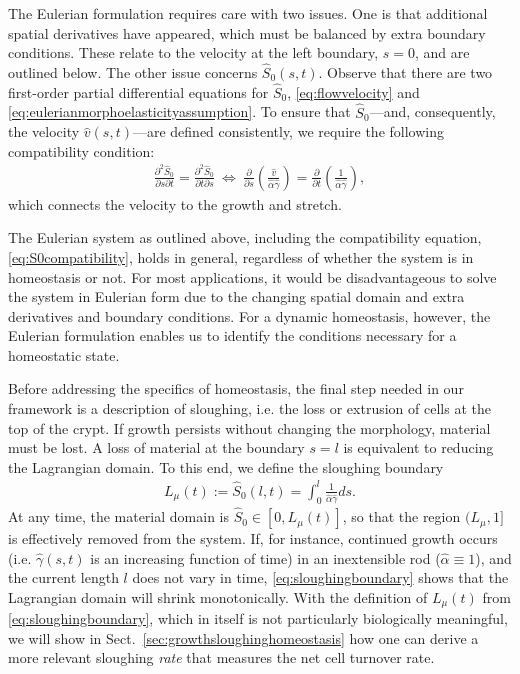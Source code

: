 The Eulerian formulation requires care with two issues. One is that additional spatial derivatives have appeared, which must be balanced by extra boundary conditions. These relate to the velocity at the left boundary, $s = 0$, and are outlined below. The other issue concerns $\hat{S}_0(s, t)$. Observe that there are two first-order partial differential equations for $\hat{S}_0$, \eqref{eq:flowvelocity} and \eqref{eq:eulerianmorphoelasticityassumption}. To ensure that $\hat{S}_0$---and, consequently, the velocity $\hat{v}(s, t)$---are defined consistently, we require the following compatibility condition:
\begin{align}
\frac{\partial^2\hat{S}_0}{\partial s\partial t} = \frac{\partial^2\hat{S}_0}{\partial t \partial s} \ \Longleftrightarrow\ \frac{\partial}{\partial s}\left(\frac{\hat{v}}{\hat{\alpha}\hat{\gamma}}\right) = \frac{\partial}{\partial t}\left(\frac{1}{\hat{\alpha}\hat{\gamma}}\right),\label{eq:S0compatibility}
\end{align}
which connects the velocity to the growth and stretch. 

The Eulerian system as outlined above, including the compatibility equation, \eqref{eq:S0compatibility}, holds in general, regardless of whether the system is in homeostasis or not. For most applications, it would be disadvantageous to solve the system in Eulerian form due to the changing spatial domain and extra derivatives and boundary conditions. For a dynamic homeostasis, however, the Eulerian formulation enables us to identify the conditions necessary for a homeostatic state. 

Before addressing the specifics of homeostasis, the final step needed in our framework is a description of sloughing, i.e. the loss or extrusion of cells at the top of the crypt. If growth persists without changing the morphology, material must be lost. A loss of material at the boundary $s=l$ is equivalent to reducing the Lagrangian domain. 
To this end, we define the sloughing boundary
\begin{align}
L_\mu(t) := \hat{S}_0(l, t) =  \int^l_0\frac{1}{\hat{\alpha}\hat{\gamma}}ds.\label{eq:sloughingboundary}
\end{align}
At any time, the material domain is $\hat{S}_0\in[0,L_\mu(t)]$, so that the region $(L_\mu,1]$ is effectively removed from the system.
If, for instance, continued growth occurs (i.e. $\hat\gamma(s, t)$ is an increasing function of time) in an inextensible rod ($\hat\alpha\equiv1$), and the current length $l$ does not vary in time, \eqref{eq:sloughingboundary} shows that the Lagrangian domain will shrink monotonically. With the definition of $L_\mu(t)$ from \eqref{eq:sloughingboundary}, which in itself is not particularly biologically meaningful, we will show in Sect.\ \ref{sec:growthsloughinghomeostasis} how one can derive a more relevant sloughing \emph{rate} that measures the net cell turnover rate.

